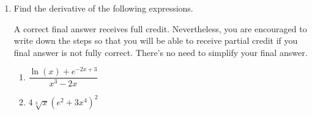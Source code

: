 \documentclass[11pt]{article}
\begin{document}
\begin{enumerate}
\begin{center}
        \begin{tabular}{l c r l c r}
            $\displaystyle\frac{d}{dx}\left[ e^2 x  \right]$ & $=$ & \rule[-8pt]{1.5in}{0.4pt} &
            $\displaystyle\frac{d}{dx}\left[ e^x-\dfrac{\log_5 3}{x^2} \right]$ & $=$ & \rule[-8pt]{1.5in}{0.4pt}\\[0.3in]
            $\displaystyle\frac{d}{dx}\left[ \left(\dfrac{\pi}{2}\right)^x \right]$ & $=$ & \rule[-8pt]{1.5in}{0.4pt} & 
            $\displaystyle\frac{d}{dx}\left[ 4\ln(x) - \sqrt[3]{e^2}\right]$ & $=$ & \rule[-8pt]{1.5in}{0.4pt}\\[0.3in]
            $\displaystyle\frac{d}{dx}\left[\log_2(x) \right]$ & $=$ & \rule[-8pt]{1.5in}{0.4pt}&
            $\displaystyle\frac{d}{dx}\left[ \dfrac{x  - x^2+2^\pi}{x^{5/3}} \right]$ & $=$ & \rule[-8pt]{1.5in}{0.4pt}\\[0.3in]
        \end{tabular} 
\end{center}


\newpage



\item Find the derivative of the following expressions. 

A correct final answer receives full credit. Nevertheless, you are encouraged to write down the steps so that you will be able to receive partial credit if you final answer is not fully correct. There's no need to simplify your final answer.

\begin{enumerate}
\item $\dfrac{\ln(x)+e^{-2x+3}}{x^3-2x}$

\vfill

\item $4\sqrt[3]{x}\left(e^2+3x^4\right)^2$

\vfill 
\end{enumerate}



\end{enumerate}
\end{document}
